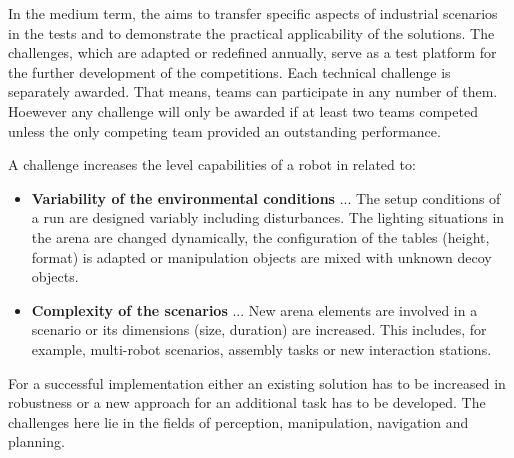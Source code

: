 
In the medium term, the \RCAW aims to transfer specific aspects of industrial scenarios in the tests and to demonstrate the practical applicability of the solutions. The challenges, which are adapted or redefined annually, serve as a test platform for the further development of the competitions. Each technical challenge is separately awarded. That means, teams can participate in any number of them. Hoewever any challenge will only be awarded if at least two teams competed unless the only competing team provided an outstanding performance.

A challenge increases the level capabilities of a robot in \RCAW related to:

\begin{itemize}
  \item \textbf{Variability of the environmental conditions} ... The setup conditions of a run are designed variably including disturbances. The lighting situations in the arena are changed dynamically, the configuration of the tables (height, format) is adapted or manipulation objects are mixed with unknown decoy objects.
  \item \textbf{Complexity of the scenarios} ... New arena elements are involved in a scenario
  or its dimensions (size, duration) are increased. This includes, for example, multi-robot scenarios, assembly tasks or new interaction stations.
\end{itemize}

For a successful implementation either an existing solution has to be increased in robustness or a new approach for an additional task has to be developed. The challenges here lie in the fields of perception, manipulation, navigation and planning.

\begin{figure}[h!]
  \centering
  \label{Examplary Challenge introducing a long term operation based on an extended Final test}
\end{figure}

